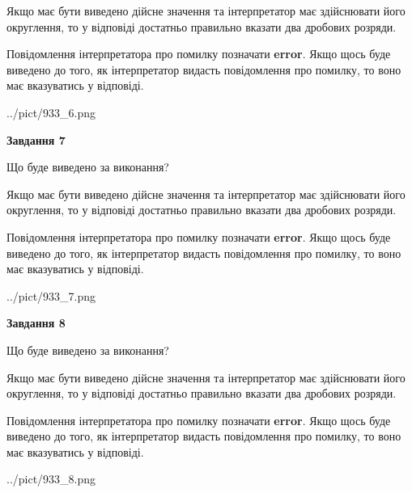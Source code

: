 \documentclass[12pt, ukrainian]{article}
\begin{document}
{\begin {Large}
Якщо має бути виведено дійсне значення та інтерпретатор має здійснювати його округлення, 
то у відповіді достатньо правильно вказати два дробових розряди.

Повідомлення інтерпретатора про помилку позначати \textbf{error}.
Якщо щось буде виведено до того, як інтерпретатор видасть повідомлення про помилку, 
то воно має вказуватись у відповіді. \par

\begin{center}
	{../pict/933_6.png}
\end{center}
\newpage

{\begin {center}\textbf{Завдання 7}\end {center}}\par
Що буде виведено за виконання? \par

Якщо має бути виведено дійсне значення та інтерпретатор має здійснювати його округлення, 
то у відповіді достатньо правильно вказати два дробових розряди.

Повідомлення інтерпретатора про помилку позначати \textbf{error}.
Якщо щось буде виведено до того, як інтерпретатор видасть повідомлення про помилку, 
то воно має вказуватись у відповіді. \par

\begin{center}
	{../pict/933_7.png}
\end{center}
\newpage

{\begin {center}\textbf{Завдання 8}\end {center}}\par
Що буде виведено за виконання? \par

Якщо має бути виведено дійсне значення та інтерпретатор має здійснювати його округлення, 
то у відповіді достатньо правильно вказати два дробових розряди.

Повідомлення інтерпретатора про помилку позначати \textbf{error}.
Якщо щось буде виведено до того, як інтерпретатор видасть повідомлення про помилку, 
то воно має вказуватись у відповіді. \par

\begin{center}
	{../pict/933_8.png}
\end{center}
\newpage


\end{Large}}
\end{document}
